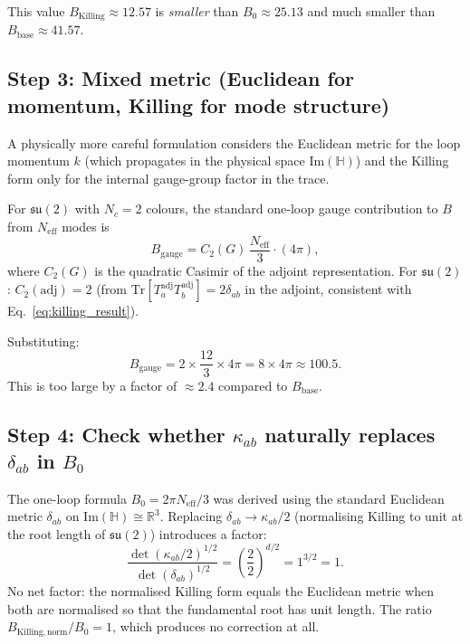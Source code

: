 \documentclass[11pt,a4paper]{article}
\theoremstyle{definition}
\theoremstyle{remark}
\begin{document}
This value $B_{\mathrm{Killing}} \approx 12.57$ is \emph{smaller} than $B_0 \approx 25.13$
and much smaller than $B_{\mathrm{base}} \approx 41.57$.

\subsection{Step 3: Mixed metric (Euclidean for momentum, Killing for mode structure)}

A physically more careful formulation considers the Euclidean metric for the
loop momentum $k$ (which propagates in the physical space $\mathrm{Im}(\mathbb{H})$)
and the Killing form only for the internal gauge-group factor in the trace.

For $\mathfrak{su}(2)$ with $N_c = 2$ colours, the standard one-loop gauge
contribution to $B$ from $N_{\mathrm{eff}}$ modes is
\begin{equation}
  B_{\mathrm{gauge}} = C_2(G)\,\frac{N_{\mathrm{eff}}}{3} \cdot (4\pi),
  \label{eq:B_gauge}
\end{equation}
where $C_2(G)$ is the quadratic Casimir of the adjoint representation.
For $\mathfrak{su}(2)$: $C_2(\mathrm{adj}) = 2$ (from $\mathrm{Tr}[T_a^{\mathrm{adj}}
T_b^{\mathrm{adj}}] = 2\delta_{ab}$ in the adjoint, consistent with
Eq.~\eqref{eq:killing_result}).

Substituting:
\begin{equation}
  B_{\mathrm{gauge}} = 2 \times \frac{12}{3} \times 4\pi = 8 \times 4\pi \approx 100.5.
  \label{eq:B_gauge_numerical}
\end{equation}
This is too large by a factor of $\approx 2.4$ compared to $B_{\mathrm{base}}$.

\subsection{Step 4: Check whether $\kappa_{ab}$ naturally replaces $\delta_{ab}$ in $B_0$}

The one-loop formula $B_0 = 2\pi N_{\mathrm{eff}}/3$ was derived using the
standard Euclidean metric $\delta_{ab}$ on $\mathrm{Im}(\mathbb{H}) \cong \mathbb{R}^3$.
Replacing $\delta_{ab} \to \kappa_{ab}/2$ (normalising Killing to unit at the root
length of $\mathfrak{su}(2)$) introduces a factor:
\begin{equation}
  \frac{\det(\kappa_{ab}/2)^{1/2}}{\det(\delta_{ab})^{1/2}}
  = \left(\frac{2}{2}\right)^{d/2}
  = 1^{3/2} = 1.
  \label{eq:det_ratio}
\end{equation}
No net factor: the normalised Killing form equals the Euclidean metric
when both are normalised so that the fundamental root has unit length.
The ratio $B_{\mathrm{Killing,norm}}/B_0 = 1$, which produces no correction at all.
\end{document}
